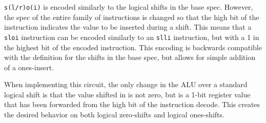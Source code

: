 

\texttt{s(l/r)o(i)} is encoded similarly to the logical shifts in the
base spec. However, the spec of the entire family of instructions is
changed so that the high bit of the instruction indicates the value to
be inserted during a shift. This means that a \texttt{sloi} instruction
can be encoded similarly to an \texttt{slli} instruction, but with a 1
in the highest bit of the encoded instruction. This encoding is
backwards compatible with the definition for the shifts in the base
spec, but allows for simple addition of a ones-insert.

When implementing this circuit, the only change in the ALU over a
standard logical shift is that the value shifted in is not zero, but is
a 1-bit register value that has been forwarded from the high bit of the
instruction decode. This creates the desired behavior on both logical
zero-shifts and logical ones-shifts.


